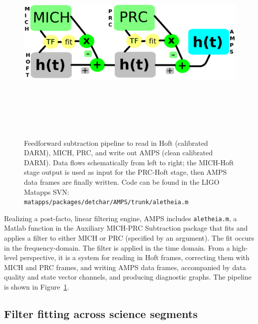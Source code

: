 \begin{figure}
\begin{center}
\includegraphics[height=100mm,width=150mm]{figure9.eps}
\caption{Feedforward subtraction pipeline to read in Hoft (calibrated DARM), MICH, PRC, and write out AMPS (clean calibrated DARM). Data flows schematically from left to right; the MICH-Hoft stage output is used as input for the PRC-Hoft stage, then AMPS data frames are finally written. Code can be found in the LIGO Matapps SVN: \texttt{matapps/packages/detchar/AMPS/trunk/aletheia.m}}
\label{pipelineGraph}
\end{center}
\end{figure}    

Realizing a post-facto, linear filtering engine, AMPS includes \texttt{aletheia.m}, a Matlab function in the Auxiliary MICH-PRC Subtraction package that fits and applies a filter to either MICH or PRC (specified by an argument). The fit occurs in the frequency-domain. The filter is applied in the time domain. From a high-level perspective, it is a system for reading in Hoft frames, correcting them with MICH and PRC frames, and writing AMPS data frames, accompanied by data quality and state vector channels, and producing diagnostic graphs. The pipeline is shown in Figure~\ref{pipelineGraph}. 


        \subsection{Filter fitting across science segments}
        \label{filter_fitting-out-of-loop}

